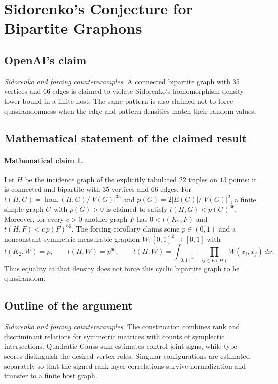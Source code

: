 \documentclass[11pt]{article}
\begin{document}
\section*{Sidorenko's Conjecture for Bipartite Graphons}

\subsection{OpenAI's claim}
\textit{Sidorenko and forcing counterexamples}: A connected bipartite graph with 35 vertices and 66 edges is claimed to violate Sidorenko’s homomorphism-density lower bound in a finite host. The same pattern is also claimed not to force quasirandomness when the edge and pattern densities match their random values.

\subsection{Mathematical statement of the claimed result}
\paragraph{Mathematical claim 1.} Let $H$ be the incidence graph of the explicitly tabulated $22$ triples on $13$ points: it is connected and bipartite with $35$ vertices and $66$ edges. For $t(H,G)=\operatorname{hom}(H,G)/|V(G)|^{35}$ and $p(G)=2|E(G)|/|V(G)|^2$, a finite simple graph $G$ with $p(G)>0$ is claimed to satisfy $t(H,G)<p(G)^{66}$. Moreover, for every $c>0$ another graph $F$ has $0<t(K_2,F)$ and $t(H,F)<c\,p(F)^{66}$. The forcing corollary claims some $p\in(0,1)$ and a nonconstant symmetric measurable graphon $W:[0,1]^2\to[0,1]$ with \[t(K_2,W)=p,\qquad t(H,W)=p^{66},\qquad t(H,W)=\int_{[0,1]^{35}}\prod_{ij\in E(H)}W(x_i,x_j)\,dx.\] Thus equality at that density does not force this cyclic bipartite graph to be quasirandom.

\subsection{Outline of the argument}
\textit{Sidorenko and forcing counterexamples}: The construction combines rank and discriminant relations for symmetric matrices with counts of symplectic intersections. Quadratic Gauss-sum estimates control joint signs, while type scores distinguish the desired vertex roles. Singular configurations are estimated separately so that the signed rank-layer correlations survive normalization and transfer to a finite host graph.
\end{document}
